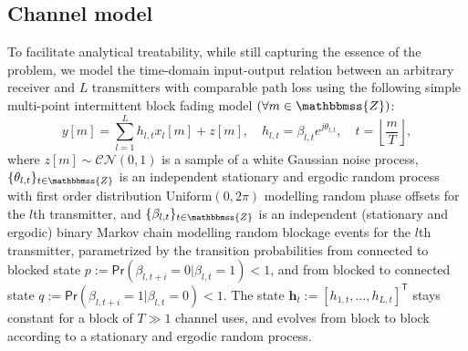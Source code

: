 \documentclass[10pt,journal,a4paper]{IEEEtran}
\renewcommand{\P}{\mathsf{Pr}} 			%
\newcommand{\stdset}[1]{\mathbbmss{#1}}	%
\renewcommand{\vec}[1]{\bm{#1}}		%
\newcommand{\CN}{\mathcal{CN}}			%
\newcommand{\T}{\mathsf{T}}				%
\begin{document}
\subsection{Channel model}
To facilitate analytical treatability, while still capturing the essence of the problem, we model the time-domain input-output relation between an arbitrary receiver and $L$ transmitters with comparable path loss using the following simple multi-point intermittent block fading model $(\forall m \in \stdset{Z})$:
\begin{equation*}
y[m] = \sum_{l=1}^Lh_{l,t}x_l[m] + z[m],\quad h_{l,t} = \beta_{l,t} e^{j\theta_{l,t}}, \quad t=\left\lfloor \frac{m}{T}\right\rfloor,
\end{equation*}
where $z[m]\sim \CN(0,1)$ is a sample of a white Gaussian noise process, $\{\theta_{l,t}\}_{t\in\stdset{Z}}$ is an independent stationary and ergodic random process with first order distribution $\text{Uniform}(0,2\pi)$ modelling random phase offsets for the $l$th transmitter, and $\{\beta_{l,t}\}_{t\in\stdset{Z}}$ is an independent (stationary and ergodic) binary Markov chain modelling random blockage events for the $l$th transmitter, parametrized by the transition probabilities from connected to blocked state $p := \P(\beta_{l,t+i} = 0|\beta_{l,t} = 1)<1$, and from blocked to connected state $q := \P(\beta_{l,t+i} = 1|\beta_{l,t} = 0)<1$. The state $\vec{h}_t:=[h_{1,t},\ldots,h_{L,t}]^\T$ stays constant for a block of $T\gg 1$ channel uses, and evolves from block to block according to a stationary and ergodic random process.
\end{document}
